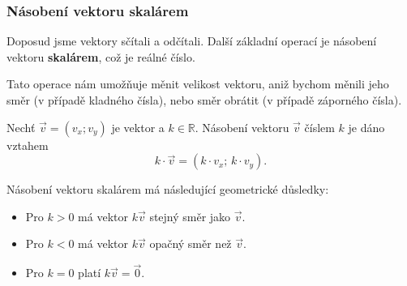 \subsubsection{Násobení vektoru skalárem}\label{subsubsec:Vector_multiplication_by_scalar}

Doposud jsme vektory sčítali a odčítali.
Další základní operací je násobení vektoru \textbf{skalárem}, což je reálné číslo.

Tato operace nám umožňuje měnit velikost vektoru,
aniž bychom měnili jeho směr (v případě kladného čísla),
nebo směr obrátit (v případě záporného čísla).

\begin{definition}\label{def:scalar_multiplication}
    Nechť $\vec{v} = (v_x; v_y)$ je vektor a $k \in \mathbb{R}$.
    Násobení vektoru $\vec{v}$ číslem $k$ je dáno vztahem
    \begin{equation}\label{eq:scalar_multiplication}
        k \cdot \vec{v} = (k \cdot v_x;\, k \cdot v_y).
    \end{equation}
\end{definition}

\begin{remark}
    Násobení vektoru skalárem má následující geometrické důsledky:
    \begin{itemize}
        \item Pro $k > 0$ má vektor $k\vec{v}$ stejný směr jako $\vec{v}$.
        \item Pro $k < 0$ má vektor $k\vec{v}$ opačný směr než $\vec{v}$.
        \item Pro $k = 0$ platí $k\vec{v} = \vec{0}$.
    \end{itemize}
\end{remark}

